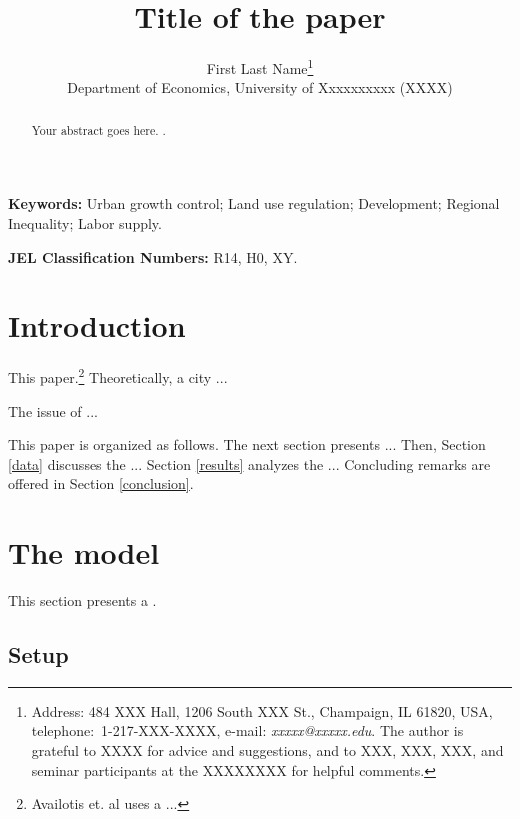 \documentclass[12pt]{article}%
\begin{document}
\title{Title of the paper}
\author{First Last Name\thanks{Address: 484 XXX Hall, 1206 South XXX St.,
Champaign, IL 61820, USA, telephone:\ 1-217-XXX-XXXX, e-mail:
\textit{xxxxx@xxxxx.edu}. The author is grateful to XXXX for advice
and suggestions, and to XXX, XXX, XXX, and seminar participants at the XXXXXXXX for helpful comments.}\medskip\\{\normalsize Department of Economics, University of Xxxxxxxxxx (XXXX)}}
\maketitle

\sloppy%

\onehalfspacing

\begin{abstract}
Your abstract goes here.
.
\end{abstract}

\strut

\textbf{Keywords:} Urban growth control; Land use
regulation; Development; Regional Inequality; Labor supply.

\strut

\textbf{JEL Classification Numbers:} R14, H0, XY.

\pagebreak%
\doublespacing %


\section{Introduction}
\label{intro} %

This paper.\footnote{Availotis et. al \cite{ASS2001} uses a ...}
Theoretically, a city ... 

The issue of ... 

This paper is organized as follows. The next section presents ... Then, Section \ref{data} discusses the ... Section \ref{results} analyzes the ... Concluding remarks are offered in Section \ref{conclusion}.

\section{The model}
\label{model}

This section presents a .

\subsection{Setup}
\end{document}
